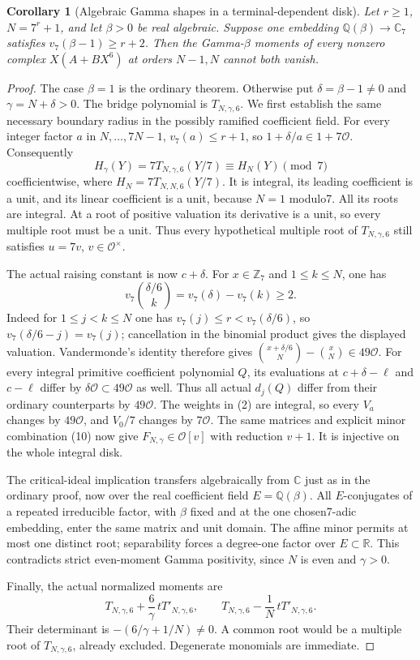 \documentclass[11pt]{article}
\newtheorem{corollary}[lemma]{Corollary}
\begin{document}
\begin{corollary}[Algebraic Gamma shapes in a terminal-dependent disk]
\label{cor:gamma-disk}
Let $r\ge1$, $N=7^r+1$, and let $\beta>0$ be real algebraic.
Suppose one embedding $\mathbb Q(\beta)\longrightarrow\mathbb C_7$
satisfies $v_7(\beta-1)\ge r+2$.
Then the Gamma-$\beta$ moments of every nonzero complex
$X(A+BX^6)$ at orders $N-1,N$ cannot both vanish.
\end{corollary}
\begin{proof}
The case $\beta=1$ is the ordinary theorem. Otherwise put
$\delta=\beta-1\ne0$ and $\gamma=N+\delta>0$.
The bridge polynomial is $T_{N,\gamma,6}$.
We first establish the same necessary boundary radius in the
possibly ramified coefficient field.
For every integer factor $a$ in $N,\ldots,7N-1$,
$v_7(a)\le r+1$, so $1+\delta/a\in1+7\mathcal O$.
Consequently
\[
 H_\gamma(Y)=7T_{N,\gamma,6}(Y/7)
                  \equiv H_N(Y)\pmod7
\]
coefficientwise, where $H_N=7T_{N,N,6}(Y/7)$.
It is integral, its leading coefficient is a unit,
and its linear coefficient is a unit, because $N=1$ modulo7.
All its roots are integral. At a root of positive valuation
its derivative is a unit, so every multiple root must be a unit.
Thus every hypothetical multiple root of $T_{N,\gamma,6}$
still satisfies $u=7v$, $v\in\mathcal O^\times$.

The actual raising constant is now $c+\delta$.
For $x\in\mathbb Z_7$ and $1\le k\le N$, one has
\[
 v_7\binom{\delta/6}{k}
          =v_7(\delta)-v_7(k)\ge2.
\]
Indeed for $1\le j<k\le N$ one has
$v_7(j)\le r<v_7(\delta/6)$, so
$v_7(\delta/6-j)=v_7(j)$; cancellation in the binomial
product gives the displayed valuation.
Vandermonde's identity therefore gives
$\binom{x+\delta/6}{N}-\binom xN\in49\mathcal O$.
For every integral primitive coefficient polynomial $Q$,
its evaluations at $c+\delta-\ell$ and $c-\ell$ differ by
$\delta\mathcal O\subset49\mathcal O$ as well.
Thus all actual $d_j(Q)$ differ from their ordinary counterparts
by $49\mathcal O$.
The weights in (2) are integral, so every $V_a$ changes by
$49\mathcal O$, and $V_0/7$ changes by $7\mathcal O$.
The same matrices and explicit minor combination (10) now give
$F_{N,\gamma}\in\mathcal O[v]$ with reduction $v+1$.
It is injective on the whole integral disk.

The critical-ideal implication transfers algebraically from
$\mathbb C$ just as in the ordinary proof, now over the real
coefficient field $E=\mathbb Q(\beta)$.
All $E$-conjugates of a repeated irreducible factor, with $\beta$
fixed and at the one chosen7-adic embedding, enter the same
matrix and unit domain. The affine minor permits at most one
distinct root; separability forces a degree-one factor over
$E\subset\mathbb R$. This contradicts strict even-moment
Gamma positivity, since $N$ is even and $\gamma>0$.

Finally, the actual normalized moments are
\[
 T_{N,\gamma,6}+\frac6\gamma\,tT'_{N,\gamma,6},
 \qquad T_{N,\gamma,6}-\frac1N\,tT'_{N,\gamma,6}.
\]
Their determinant is $-(6/\gamma+1/N)\ne0$.
A common root would be a multiple root of $T_{N,\gamma,6}$,
already excluded. Degenerate monomials are immediate.
\end{proof}
\end{document}
